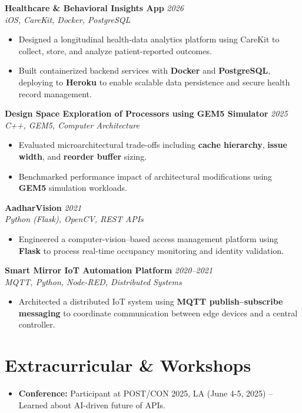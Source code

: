 \documentclass[letterpaper,11pt]{article}
\begin{document}
\textbf{Healthcare \& Behavioral Insights App} \hfill \textit{2026} \\
\textit{iOS, CareKit, Docker, PostgreSQL}
\begin{itemize} \itemsep -2pt
    \item Designed a longitudinal health-data analytics platform using CareKit to collect, store, and analyze patient-reported outcomes.
    \item Built containerized backend services with \textbf{Docker} and \textbf{PostgreSQL}, deploying to \textbf{Heroku} to enable scalable data persistence and secure health record management.
\end{itemize}

\textbf{Design Space Exploration of Processors using GEM5 Simulator} \hfill \textit{2025} \\
\textit{C++, GEM5, Computer Architecture}
\begin{itemize} \itemsep -2pt
    \item Evaluated microarchitectural trade-offs including \textbf{cache hierarchy}, \textbf{issue width}, and \textbf{reorder buffer} sizing.
    \item Benchmarked performance impact of architectural modifications using \textbf{GEM5} simulation workloads.
\end{itemize}

\textbf{AadharVision} \hfill \textit{2021} \\
\textit{Python (Flask), OpenCV, REST APIs}
\begin{itemize} \itemsep -2pt
    \item Engineered a computer-vision–based access management platform using \textbf{Flask} to process real-time occupancy monitoring and identity validation.
\end{itemize}

\textbf{Smart Mirror IoT Automation Platform} \hfill \textit{2020--2021} \\
\textit{MQTT, Python, Node-RED, Distributed Systems}
\begin{itemize} \itemsep -2pt
    \item Architected a distributed IoT system using \textbf{MQTT publish–subscribe messaging} to coordinate communication between edge devices and a central controller.
\end{itemize}

\section*{Extracurricular \& Workshops}
\begin{itemize} \itemsep -2pt
    \item \textbf{Conference:} Participant at POST/CON 2025, LA (June 4-5, 2025) -- Learned about AI-driven future of APIs.
\end{itemize}
\end{document}
